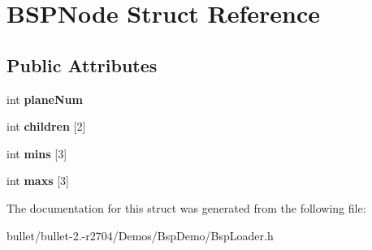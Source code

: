 \hypertarget{struct_b_s_p_node}{\section{B\+S\+P\+Node Struct Reference}
\label{struct_b_s_p_node}
}
\subsection*{Public Attributes}
\begin{DoxyCompactItemize}
\item 
\hypertarget{struct_b_s_p_node_abdf180bf26ae7d9932687609bd6edb18}{int {\bfseries plane\+Num}}\label{struct_b_s_p_node_abdf180bf26ae7d9932687609bd6edb18}

\item 
\hypertarget{struct_b_s_p_node_ac521258427f45bf921b1568dd7ca3a96}{int {\bfseries children} \mbox{[}2\mbox{]}}\label{struct_b_s_p_node_ac521258427f45bf921b1568dd7ca3a96}

\item 
\hypertarget{struct_b_s_p_node_a827b7f0775a06ebfea730ae31aea8ccf}{int {\bfseries mins} \mbox{[}3\mbox{]}}\label{struct_b_s_p_node_a827b7f0775a06ebfea730ae31aea8ccf}

\item 
\hypertarget{struct_b_s_p_node_aeb30f4e63d508181c06950f1c7306964}{int {\bfseries maxs} \mbox{[}3\mbox{]}}\label{struct_b_s_p_node_aeb30f4e63d508181c06950f1c7306964}

\end{DoxyCompactItemize}


The documentation for this struct was generated from the following file\+:\begin{DoxyCompactItemize}
\item 
bullet/bullet-\/2.-\/r2704/\+Demos/\+Bsp\+Demo/Bsp\+Loader.\+h\end{DoxyCompactItemize}
